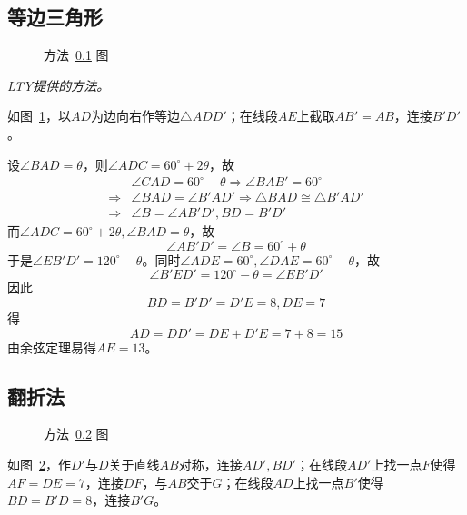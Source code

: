 \subsection{等边三角形} \label{subsec:000A-eqtri}

\begin{figure}[htbp]
  \centering {}
  \caption{方法~\ref{subsec:000A-eqtri} 图} \label{fig:000A-eqtri}
\end{figure}

\emph{LTY提供的方法。}

如图~\ref{fig:000A-eqtri}，以$AD$为边向右作等边$\triangle ADD'$；在线段$AE$上截取$AB' = AB$，连接$B'D'$。

设$\angle BAD = \theta$，则$\angle ADC = 60^\circ + 2\theta$，故
\begin{align*}
  & \angle CAD = 60^\circ - \theta \Rightarrow \angle BAB' = 60^\circ \\
  \Rightarrow{}& \angle BAD = \angle B'AD' \Rightarrow \triangle BAD \cong \triangle B'AD' \\
  \Rightarrow{}& \angle B = \angle AB'D', BD = B'D'
\end{align*}
而$\angle ADC = 60^\circ + 2\theta, \angle BAD = \theta$，故
\[ \angle AB'D' = \angle B = 60^\circ + \theta \]
于是$\angle EB'D' = 120^\circ - \theta$。同时$\angle ADE = 60^\circ, \angle DAE = 60^\circ - \theta$，故
\[ \angle B'ED' = 120^\circ - \theta = \angle EB'D' \]
因此
\[ BD = B'D' = D'E = 8, DE = 7 \]
得
\[ AD = DD' = DE + D'E = 7 + 8 = 15 \]
由余弦定理易得$AE = 13$。

\subsection{翻折法} \label{subsec:000A-fold}

\begin{figure}[htbp]
  \centering {}
  \caption{方法~\ref{subsec:000A-fold} 图} \label{fig:000A-fold}
\end{figure}

如图~\ref{fig:000A-fold}，作$D'$与$D$关于直线$AB$对称，连接$AD', BD'$；在线段$AD'$上找一点$F$使得$AF = DE = 7$，连接$DF$，与$AB$交于$G$；在线段$AD$上找一点$B'$使得$BD = B'D = 8$，连接$B'G$。

